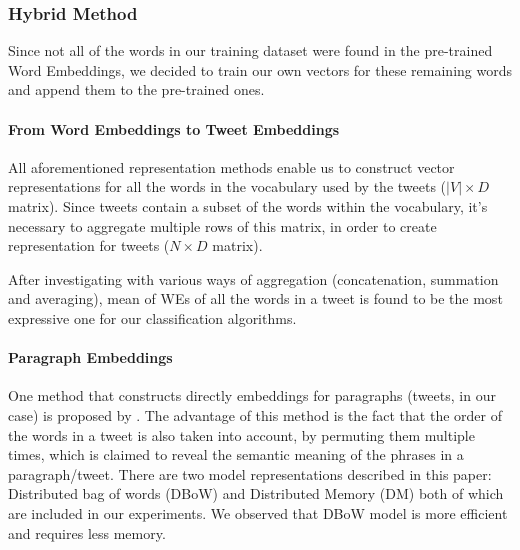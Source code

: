 \subsubsection{Hybrid Method}
Since not all of the words in our training dataset were found in the pre-trained Word Embeddings, we decided to train our own vectors for these remaining words and append them to the pre-trained ones.


\paragraph{\textbf{From Word Embeddings to Tweet Embeddings}}
All aforementioned representation methods enable us to construct vector representations for all the words in the vocabulary used by the tweets ($|V| \times D$ matrix).
Since tweets contain a subset of the words within the vocabulary, it's necessary to aggregate multiple rows of this matrix, in order to create representation for tweets ($N \times D$ matrix).

After investigating with various ways of aggregation (concatenation, summation and averaging), mean of WEs of all the words in a tweet is found to be the most expressive one for our classification algorithms.


\paragraph{\textbf{Paragraph Embeddings}}
One method that constructs directly embeddings for paragraphs (tweets, in our case) is proposed by \cite{le2014distributed}.
The advantage of this method is the fact that the order of the words in a tweet is also taken into account, by permuting them multiple times, which is claimed to reveal the semantic meaning of the phrases in a paragraph/tweet.
There are two model representations described in this paper: Distributed bag of words (DBoW) and Distributed Memory (DM) both of which are included in our experiments.
We observed that DBoW model is more efficient and requires less memory.
